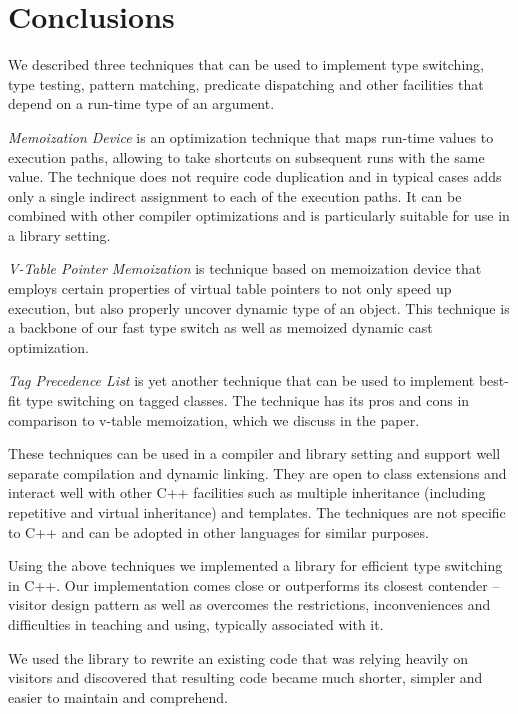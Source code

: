 \section{Conclusions} %
\label{sec:cc}

We described three techniques that can be used to implement type switching, type 
testing, pattern matching, predicate dispatching and other facilities that 
depend on a run-time type of an argument.

\emph{Memoization Device} is an optimization technique that maps run-time values 
to execution paths, allowing to take shortcuts on subsequent runs with the same 
value. The technique does not require code duplication and in typical cases adds 
only a single indirect assignment to each of the execution paths. It can be 
combined with other compiler optimizations and is particularly suitable for use 
in a library setting.

\emph{V-Table Pointer Memoization} is technique based on memoization device that 
employs certain properties of virtual table pointers to not only speed up 
execution, but also properly uncover dynamic type of an object. This technique 
is a backbone of our fast type switch as well as memoized dynamic cast 
optimization.

\emph{Tag Precedence List} is yet another technique that can be used to 
implement best-fit type switching on tagged classes. The technique has its pros 
and cons in comparison to v-table memoization, which we discuss in the paper.

These techniques can be used in a compiler and library setting and support well 
separate compilation and dynamic linking. They are open to class extensions and 
interact well with other C++ facilities such as multiple inheritance (including 
repetitive and virtual inheritance) and templates. The techniques are not 
specific to C++ and can be adopted in other languages for similar purposes.

Using the above techniques we implemented a library for efficient type switching 
in C++. Our implementation comes close or outperforms its closest contender -- 
visitor design pattern as well as overcomes the restrictions, inconveniences and 
difficulties in teaching and using, typically associated with it.

We used the library to rewrite an existing code that was relying heavily on 
visitors and discovered that resulting code became much shorter, simpler and easier 
to maintain and comprehend.
